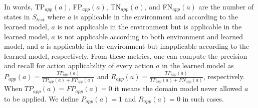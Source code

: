 \documentclass[letterpaper]{article} %
\newcommand{\app}{\ensuremath{\textit{app}}\xspace}
\newcommand{\stest}{\ensuremath{S_{\textit{test}}}\xspace}
\newif\ifaddcomments
\newcommand{\roni}[1]{\ifaddcomments{\textcolor{red}{[Roni: #1]}}\fi}
\newcommand{\argaman}[1]{\ifaddcomments{\textcolor{blue}{[Argaman: #1]}}\fi}
\begin{document}
In words, TP$_{\app}(a)$, FP$_{\app}(a)$, TN$_{\app}(a)$, and FN$_{\app}(a)$ are the number of states in \stest where 
$a$ is applicable in the environment and according to the learned model, 
$a$ is not applicable in the environment but is applicable in the learned model, 
$a$ is not applicable according to both environment and learned model, 
and $a$ is applicable in the environment but inapplicable according to the learned model, respectively. 
From these metrics, one can compute the precision and recall 
for action applicability
of every action $a$ in the learned model as 
$P_{\app}(a)= \frac{TP_{\app}(a)}{TP_{\app}(a)+FP_{\app}(a)}$ 
and $R_{\app}(a)= \frac{TP_{\app}(a)}{TP_{\app}(a)+FN_{\app}(a)}$, 
respectively. 
When $TP_{\app}(a)=FP_{\app}(a)=0$ it means the domain model never allowed $a$ to be applied. We define $P_{\app}(a)=1$ and $R_{\app}(a)=0$  in such cases. %






\end{document}
